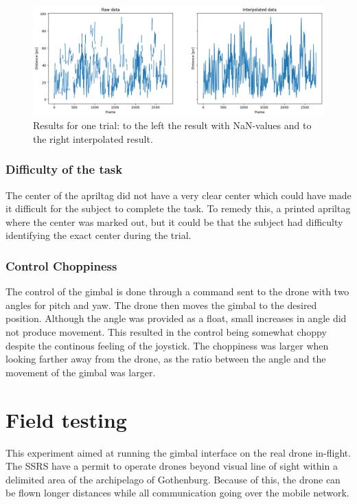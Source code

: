 \documentclass[nofilelist]{cslthse-msc}
\begin{document}
\begin{figure}[!hbt]
   \centering
   \includegraphics[scale=0.5]{images/raw-vs-interpolated.png} 
   \caption{Results for one trial: to the left the result with NaN-values and to the right interpolated result.}
   \label{fig:raw-vs-interpolated}
\end{figure}

\subsubsection{Difficulty of the task}
The center of the apriltag did not have a very clear center which could have made it difficult for the subject to complete the task. To remedy this, a printed apriltag where the center was marked out, but it could be that the subject had difficulty identifying the exact center during the trial.

\subsubsection{Control Choppiness}
\label{sec:control-choppiness}
The control of the gimbal is done through a command sent to the drone with two angles for pitch and yaw. The drone then moves the gimbal to the desired position. Although the angle was provided as a float, small increases in angle did not produce movement. This resulted in the control being somewhat choppy despite the continous feeling of the joystick. The choppiness was larger when looking farther away from the drone, as the ratio between the angle and the movement of the gimbal was larger. 

\section{Field testing}
This experiment aimed at running the gimbal interface on the real drone in-flight. The SSRS have a permit to operate drones beyond visual line of sight within a delimited area of the archipelago of Gothenburg. Because of this, the drone can be flown longer distances while all communication going over the mobile network. 
\end{document}
